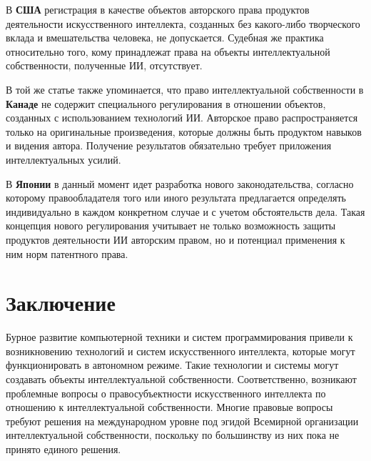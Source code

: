 В \textbf{США} регистрация в качестве объектов авторского права продуктов деятельности
искусственного интеллекта, созданных без какого-либо творческого вклада и вмешательства человека, не
допускается. Судебная же практика относительно того, кому принадлежат права на объекты интеллектуальной
собственности, полученные ИИ, отсутствует.

В той же статье \cite{abr} также упоминается, что право интеллектуальной собственности в \textbf{Канаде}
не содержит специального регулирования в отношении объектов, созданных с использованием технологий
ИИ. Авторское право распространяется только на оригинальные произведения, которые должны быть
продуктом навыков и видения автора. Получение результатов обязательно требует приложения интеллектуальных
усилий.

В \textbf{Японии} в данный момент идет разработка нового законодательства, согласно которому правообладателя
того или иного результата предлагается определять индивидуально в каждом конкретном случае и с учетом
обстоятельств дела. Такая концепция нового регулирования учитывает не только возможность защиты
продуктов деятельности ИИ авторским правом, но и потенциал применения к ним норм патентного права.

\newpage

\section{Заключение}
Бурное развитие компьютерной техники и систем программирования привели к возникновению технологий и
систем искусственного интеллекта, которые могут функционировать в автономном режиме. Такие технологии
и системы могут создавать объекты интеллектуальной собственности. Соответственно, возникают проблемные
вопросы о правосубъектности искусственного интеллекта по отношению к интеллектуальной собственности.
Многие правовые вопросы требуют решения на международном уровне под эгидой Всемирной организации интеллектуальной
собственности, поскольку по большинству из них пока не принято единого решения.
\newpage


